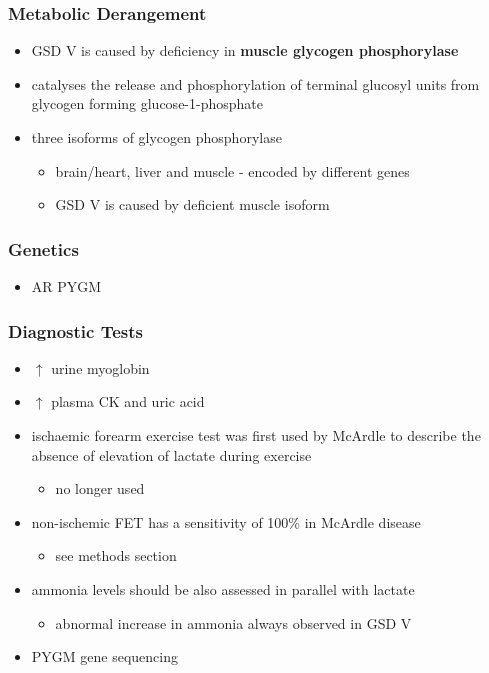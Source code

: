 \documentclass[12pt]{scrartcl}
\begin{document}
\subsubsection{Metabolic Derangement}
\label{sec:org5dbfde2}
\begin{itemize}
\item GSD V is caused by deficiency in \textbf{muscle glycogen phosphorylase}
\item catalyses the release and phosphorylation of terminal glucosyl units
from glycogen forming glucose-1-phosphate
\item three isoforms of glycogen phosphorylase
\begin{itemize}
\item brain/heart, liver and muscle - encoded by different genes
\item GSD V is caused by deficient muscle isoform
\end{itemize}
\end{itemize}

\subsubsection{Genetics}
\label{sec:orgbd5a29b}
\begin{itemize}
\item AR PYGM
\end{itemize}

\subsubsection{Diagnostic Tests}
\label{sec:org6d7db9c}
\begin{itemize}
\item \(\uparrow\) urine myoglobin
\item \(\uparrow\) plasma CK and uric acid
\item ischaemic forearm exercise test was first used by McArdle to
describe the absence of elevation of lactate during exercise
\begin{itemize}
\item no longer used
\end{itemize}
\item non-ischemic FET has a sensitivity of 100\% in McArdle disease
\begin{itemize}
\item see methods section
\end{itemize}
\item ammonia levels should be also assessed in parallel with lactate
\begin{itemize}
\item abnormal increase in ammonia always observed in GSD V
\end{itemize}
\item PYGM gene sequencing
\end{itemize}
\end{document}

